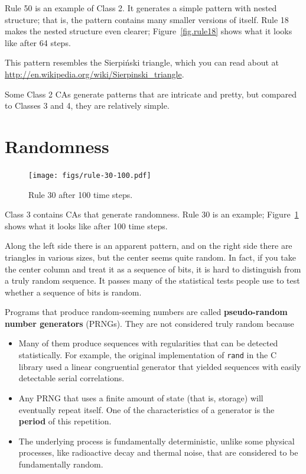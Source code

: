 \documentclass[10pt]{book}
\begin{document}
Rule 50 is an example of Class 2.  It generates a simple pattern with
nested structure; that is, the pattern contains many smaller versions
of itself.  Rule 18 makes the nested structure even clearer;
Figure~\ref{fig.rule18} shows what it looks like after 64 steps.
 
This pattern resembles the Sierpi\'{n}ski triangle, which
you can read about at \url{http://en.wikipedia.org/wiki/Sierpinski_triangle}.

Some Class 2 CAs generate patterns that are intricate and
pretty, but compared to Classes 3 and 4, they are relatively
simple.


\section{Randomness}

\begin{figure}
\centerline{\texttt{[image: figs/rule-30-100.pdf]}}
\caption{Rule 30 after 100 time steps.\label{fig.rule30}}
\end{figure}

Class 3 contains CAs that generate randomness.
Rule 30 is an example; Figure~\ref{fig.rule30} shows what it looks like
after 100 time steps.

Along the left side there is an apparent pattern, and on the right
side there are triangles in various sizes, but the center seems
quite random.  In fact, if you take the center column and treat it as a
sequence of bits, it is hard to distinguish from a truly random
sequence.  It passes many of the statistical tests people use
to test whether a sequence of bits is random.

Programs that produce random-seeming numbers are called
{\bf pseudo-random number generators} (PRNGs).  They are not considered
truly random because

\begin{itemize}

\item Many of them produce sequences with regularities that
can be detected statistically.  For example, the original implementation
of {\tt rand} in the C library used a linear congruential generator
that yielded sequences with easily detectable serial correlations.

\item Any PRNG that uses a finite amount
of state (that is, storage) will eventually repeat itself.  One of the
characteristics of a generator is the {\bf period} of this
repetition.

\item The underlying process is fundamentally deterministic,
unlike some physical processes, like radioactive decay and
thermal noise, that are considered to be fundamentally
random.

\end{itemize}
\end{document}

